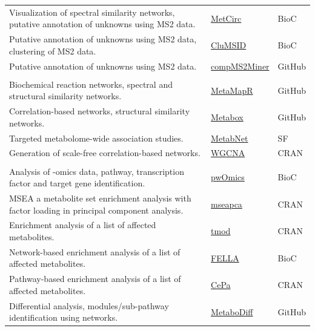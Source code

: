 \documentclass[]{article}
\begin{document}
\begin{longtable}[t]{>{\raggedright\arraybackslash}p{30em}>{\raggedright\arraybackslash}p{10em}>{\raggedright\arraybackslash}p{3em}}
Visualization of spectral similarity networks, putative annotation of unknowns using MS2 data. & \href{https://bioconductor.org/packages/release/bioc/html/MetCirc.html}{MetCirc} & BioC\\
\rowcolor{gray!6}  Putative annotation of unknowns using MS2 data, clustering of MS2 data. & \href{https://bioconductor.org/packages/devel/bioc/html/CluMSID.html}{CluMSID} & BioC\\
Putative annotation of unknowns using MS2 data. & \href{https://github.com/WMBEdmands/compMS2Miner}{compMS2Miner} & GitHub\\
\rowcolor{gray!6}  \addlinespace[0.3em]
\multicolumn{3}{l}{\textbf{Generation of metabolite networks}}\\
Biochemical reaction networks, spectral and structural similarity networks. & \href{http://dgrapov.github.io/MetaMapR/}{MetaMapR} & GitHub\\
Correlation-based networks, structural similarity networks. & \href{http://kwanjeeraw.github.io/metabox/}{Metabox} & GitHub\\
\rowcolor{gray!6}  Targeted metabolome-wide association studies. & \href{https://sourceforge.net/projects/metabnet/}{MetabNet} & SF\\
Generation of scale-free correlation-based networks. & \href{https://cran.r-project.org/package=WGCNA}{WGCNA} & CRAN\\
\rowcolor{gray!6}  \addlinespace[0.3em]
\multicolumn{3}{l}{\textbf{Pathway analysis}}\\
Analysis of -omics data, pathway, transcription factor and target gene identification. & \href{https://doi.org/doi:10.18129/B9.bioc.pwOmics}{pwOmics} & BioC\\
MSEA a metabolite set enrichment analysis with factor loading in principal component analysis. & \href{https://cran.r-project.org/package=mseapca}{mseapca} & CRAN\\
\rowcolor{gray!6}  Enrichment analysis of a list of affected metabolites. & \href{https://cran.r-project.org/package=tmod}{tmod} & CRAN\\
Network-based enrichment analysis of a list of affected metabolites. & \href{https://bioconductor.org/packages/release/bioc/html/FELLA.html}{FELLA} & BioC\\
\rowcolor{gray!6}  Pathway-based enrichment analysis of a list of affected metabolites. & \href{https://cran.r-project.org/package=CePa}{CePa} & CRAN\\
Differential analysis, modules/sub-pathway identification using networks. & \href{https://github.com/andreasmock/MetaboDiff}{MetaboDiff} & GitHub\\

\end{longtable}
\end{document}
